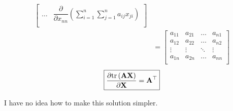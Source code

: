 \documentclass{article}
\newcommand{\trans}{\top}
\begin{document}
\begin{align*}
\begin{bmatrix}
        \dots & 
        \displaystyle \dfrac{\partial}{\partial x_{nn}} \left( \sum_{i = 1}^{n} \sum_{j = 1}^{n} a_{ij}x_{ji} \right) \\
    \end{bmatrix} \\
    &= \begin{bmatrix}
            a_{11} & a_{21} & \dots & a_{n1} \\
            a_{12} & a_{22} & \dots & a_{n2} \\
            \vdots & \vdots & \ddots & \vdots \\
            a_{1n} & a_{2n} & \dots & a_{nn} \\
        \end{bmatrix}
\end{align*}
\begin{align}
    \boxed{\dfrac{\partial \textnormal{tr}\left(\mathbf{A} \mathbf{X}\right)}{\partial \mathbf{X}} = \mathbf{A}^\trans}
\end{align}

I have no idea how to make this solution simpler.
\end{document}
